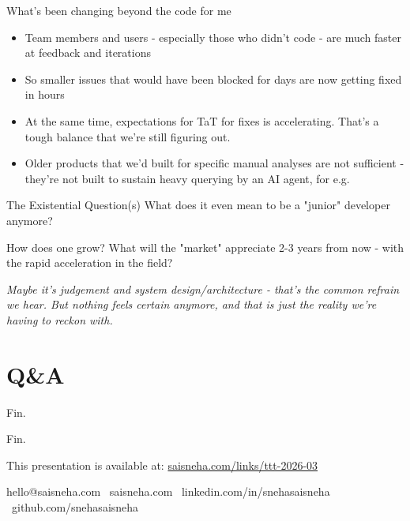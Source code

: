 \documentclass{beamer}
\begin{document}
\begin{frame}{What's been changing beyond the code for me}
    \begin{itemize}[<+->]
        \item Team members and users - especially those who didn't code - are much faster at feedback and iterations
        \item So smaller issues that would have been blocked for days are now getting fixed in hours
        \item At the same time, expectations for TaT for fixes is accelerating. That's a tough balance that we're still figuring out.
        \item Older products that we'd built for specific manual analyses are not sufficient - they're not built to sustain heavy querying by an AI agent, for e.g.
    \end{itemize}
\end{frame}

\begin{frame}{The Existential Question(s)}
    \Large
    What does it even mean to be a "junior" developer anymore?

    \vspace{1em}
    \normalsize
    How does one grow? What will the "market" appreciate 2-3 years from now - with the rapid acceleration in the field?

    \vspace{1em}
    \textit{Maybe it's judgement and system design/architecture - that's the common refrain we hear. But nothing feels certain anymore, and that is just the reality we're having to reckon with.}

\end{frame}

\section{Q\&A}

\begin{frame}{Fin.}
    \begin{center}
        \Large
        Fin.

        \vspace{1em}

        \footnotesize

        This presentation is available at: \url{saisneha.com/links/ttt-2026-03}
    

    \vspace{2em}
    \normalsize
    hello@saisneha.com \textbar\ saisneha.com \textbar\ linkedin.com/in/snehasaisneha \textbar\ github.com/snehasaisneha

    \end{center}
\end{frame}
\end{document}
